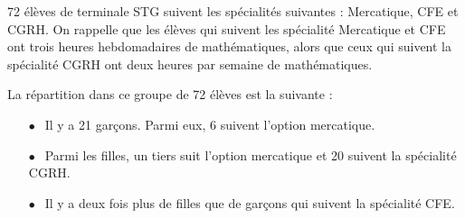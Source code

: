 \documentclass[10pt,a4paper]{article}
\begin{document}
\medskip
{\footnotesize
72 élèves de terminale STG suivent  les spécialités suivantes :  Mercatique, CFE et CGRH. On rappelle que les élèves qui suivent les spécialité Mercatique et CFE ont  trois  heures hebdomadaires de mathématiques, alors que ceux qui suivent la spécialité CGRH ont deux heures par semaine de mathématiques.

\medskip

La répartition dans ce groupe de 72 élèves est la suivante :

\setlength\parindent{6mm}
\begin{itemize}
\item[$\bullet~~$] Il y a 21 garçons. Parmi eux, 6 suivent l’option mercatique.
\item[$\bullet~~$] Parmi les filles, un tiers suit l'option mercatique et 20 suivent la spécialité CGRH.
\item[$\bullet~~$] Il y a deux fois plus de filles que de garçons qui suivent la spécialité CFE. 
\end{itemize}
\setlength\parindent{0mm}

\medskip
}
\end{document}
